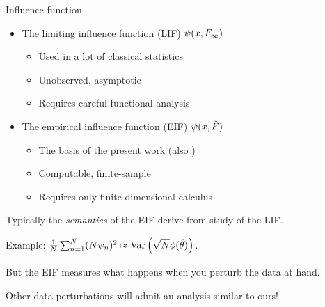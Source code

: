 

\begin{frame}[t]{Influence function}

\begin{itemize}
%
\item The limiting influence function (LIF) $\psi(x, F_{\infty})$
    \begin{itemize}
        \item Used in a lot of classical statistics
            \citep{
                mises1947asymptotic,
                huber1981robust, hampel1986robustbook,
                bickel1993semiparametric}
        \item Unobserved, asymptotic
        \item Requires careful functional analysis
            \citep{reeds1976thesis}
    \end{itemize}
\item The empirical influence function (EIF) $\psi(x, \hat{F})$
    \begin{itemize}
        \item The basis of the present work
            (also \citep{giordano2019swiss, giordano2019higherorder})
        \item Computable, finite-sample
        \item Requires only finite-dimensional calculus
    \end{itemize}
%
\end{itemize}

\vspace{1em}
Typically the {\em semantics} of the EIF derive from study of the LIF.

Example: $\frac{1}{N}\sum_{n=1}^N (N \psi_n)^2 \approx \underset{}{\mathrm{Var}}\left(\sqrt{N}\phi(\hat{\theta})\right)$.

\vspace{1em}
But the EIF measures what happens when you perturb the data at hand.

\vspace{1em}
Other data perturbations will admit an analysis similar to ours!

\end{frame}





